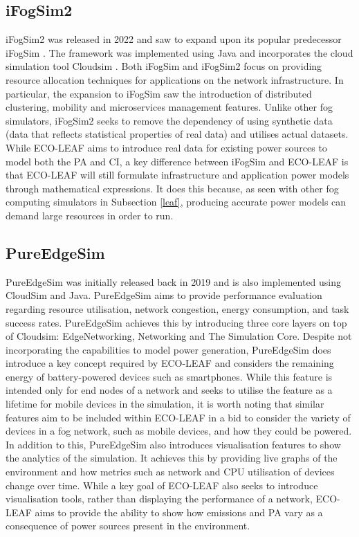 \documentclass{l4proj}
\begin{document}
\subsection{iFogSim2}
iFogSim2 \citep{IFOGSIM2} was released in 2022 and saw to expand upon its popular predecessor iFogSim \citep{IFOGSIM}.
The framework was implemented using Java and incorporates the cloud simulation tool Cloudsim \citep{cloudsim}.
Both iFogSim and iFogSim2 focus on providing resource allocation techniques for applications on the network infrastructure.
In particular, the expansion to iFogSim saw the introduction of distributed clustering, mobility and microservices management features.
Unlike other fog simulators, iFogSim2 seeks to remove the dependency of using synthetic data (data that reflects statistical properties of real data) and utilises actual datasets.
While ECO-LEAF aims to introduce real data for existing power sources to model both the PA and CI, a key difference between iFogSim and ECO-LEAF is that ECO-LEAF will still formulate infrastructure and application power models through mathematical expressions.
It does this because, as seen with other fog computing simulators in Subsection \ref{leaf}, producing accurate power models can demand large resources in order to run.

\subsection{PureEdgeSim}
PureEdgeSim \citep{pureedgesim} was initially released back in 2019 and is also implemented using CloudSim and Java.
PureEdgeSim aims to provide performance evaluation regarding resource utilisation, network congestion, energy consumption, and task success rates.
PureEdgeSim achieves this by introducing three core layers on top of Cloudsim: EdgeNetworking, Networking and The Simulation Core.
Despite not incorporating the capabilities to model power generation, PureEdgeSim does introduce a key concept required by ECO-LEAF and considers the remaining energy of battery-powered devices such as smartphones.
While this feature is intended only for end nodes of a network and seeks to utilise the feature as a lifetime for mobile devices in the simulation, it is worth noting that similar features aim to be included within ECO-LEAF in a bid to consider the variety of devices in a fog network, such as mobile devices, and how they could be powered.
In addition to this, PureEdgeSim also introduces visualisation features to show the analytics of the simulation.
It achieves this by providing live graphs of the environment and how metrics such as network and CPU utilisation of devices change over time.
While a key goal of ECO-LEAF also seeks to introduce visualisation tools, rather than displaying the performance of a network, ECO-LEAF aims to provide the ability to show how emissions and PA vary as a consequence of power sources present in the environment.
\end{document}
